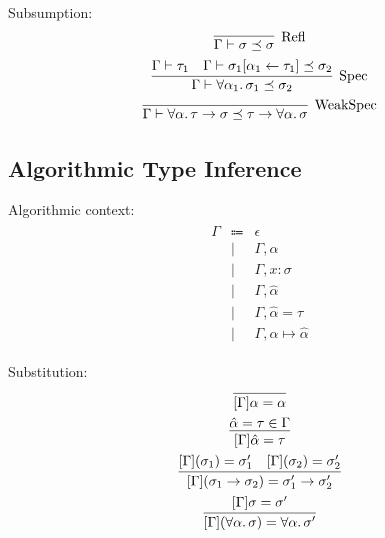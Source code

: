 Subsumption:
\begin{gather*}
  \infer[\text{Refl}]{
    \Gamma \vdash \sigma \preceq \sigma
  }{}
  \\
  \infer[\text{Spec}]{
    \Gamma \vdash \forall \alpha_1\ldotp \sigma_1 \preceq \sigma_2
  }{
    \Gamma \vdash \tau_1
    &
    \Gamma \vdash \sigma_1[\alpha_1 \assign \tau_1] \preceq \sigma_2
  }
  \\
  \infer[\text{WeakSpec}]{
    \Gamma \vdash \forall \alpha\ldotp \tau \to \sigma \preceq \tau \to \forall \alpha\ldotp\sigma
  }{}
\end{gather*}

\subsection{Algorithmic Type Inference}

Algorithmic context:
\begin{align*}
  \begin{array}{rcl}
    \Gamma &\Coloneq &\epsilon \\
    &\mid &\Gamma, \alpha \\
    &\mid &\Gamma, x: \sigma \\
    &\mid &\Gamma, \hat{\alpha} \\
    &\mid &\Gamma, \hat{\alpha} = \tau \\
    &\mid &\Gamma, \alpha \mapsto \hat{\alpha}
  \end{array}
\end{align*}

Substitution:
\begin{gather*}
  \infer{[\Gamma]\alpha = \alpha}{}
  \\
  \infer{[\Gamma]\hat{\alpha} = \tau}{
    \hat{\alpha} = \tau \in \Gamma
  }
  \\
  \infer{[\Gamma](\sigma_1 \to \sigma_2) = \sigma_1' \to \sigma_2'}{
    [\Gamma](\sigma_1) = \sigma_1'
    &
    [\Gamma](\sigma_2) = \sigma_2'
  }
  \\
  \infer{[\Gamma](\forall \alpha\ldotp \sigma) = \forall \alpha\ldotp \sigma'}{
    [\Gamma]\sigma = \sigma'
  }
\end{gather*}

